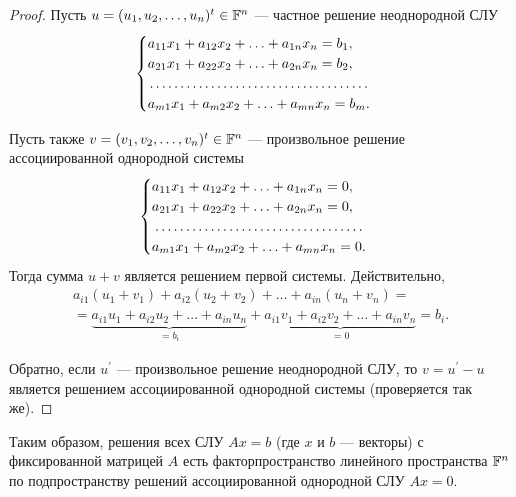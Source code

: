 \begin{proof}
    Пусть $u = (u_1, u_2, \ldots, u_n)^t \in \mathbb{F}^n$ --- частное решение неоднородной СЛУ
    \[
        \begin{cases}
            a_{11}x_1 + a_{12}x_2 + \ldots + a_{1n}x_n = b_1,\\
            a_{21}x_1 + a_{22}x_2 + \ldots + a_{2n}x_n = b_2,\\
            \dotfill\\
            a_{m1}x_1 + a_{m2}x_2 + \ldots + a_{mn}x_n = b_m.\\
        \end{cases}
    \]

    Пусть также $v = (v_1, v_2, \ldots, v_n)^t \in \mathbb{F}^n$ --- произвольное решение ассоциированной однородной системы
    \[
        \begin{cases}
            a_{11}x_1 + a_{12}x_2 + \ldots + a_{1n}x_n = 0,\\
            a_{21}x_1 + a_{22}x_2 + \ldots + a_{2n}x_n = 0,\\
            \dotfill\\
            a_{m1}x_1 + a_{m2}x_2 + \ldots + a_{mn}x_n = 0.\\
        \end{cases}
    \]
    Тогда сумма $u + v$ является решением первой системы. Действительно,
    \begin{multline*}
        a_{i1}(u_1 + v_1) + a_{i2}(u_2 + v_2) + \ldots + a_{in}(u_n + v_n) =\\ = \underbrace{a_{i1}u_1 + a_{i2}u_2 + \ldots + a_{in}u_n}_{= b_i} + \underbrace{a_{i1}v_1 + a_{i2}v_2 + \ldots + a_{in}v_n}_{= 0} = b_i.
    \end{multline*}

    Обратно, если $u^\prime$ --- произвольное решение неоднородной СЛУ, то $v = u^\prime - u$ является решением ассоциированной однородной системы (проверяется так же).
\end{proof}

Таким образом, решения всех СЛУ $Ax = b$ (где $x$ и $b$ --- векторы) с фиксированной матрицей $A$ есть факторпространство линейного пространства $\mathbb{F}^n$ по подпространству решений ассоциированной однородной СЛУ $Ax = 0$.

